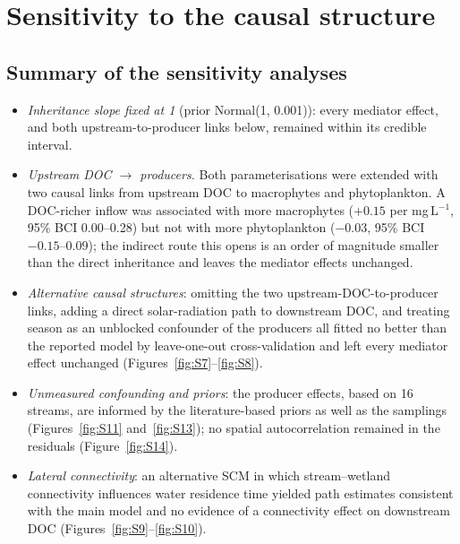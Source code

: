 \documentclass[11pt,a4paper]{article}
\begin{document}
\FloatBarrier
\section{Sensitivity to the causal structure}
\subsection{Summary of the sensitivity analyses}
\begin{itemize}
\item \emph{Inheritance slope fixed at 1} (prior Normal(1, 0.001)): every mediator effect, and both upstream-to-producer links below, remained within its credible interval.
\item \emph{Upstream DOC $\rightarrow$ producers.} Both parameterisations were extended with two causal links from upstream DOC to macrophytes and phytoplankton. A DOC-richer inflow was associated with more macrophytes ($+0.15$ per mg\,L$^{-1}$, 95\% BCI 0.00--0.28) but not with more phytoplankton ($-0.03$, 95\% BCI $-0.15$--0.09); the indirect route this opens is an order of magnitude smaller than the direct inheritance and leaves the mediator effects unchanged.
\item \emph{Alternative causal structures}: omitting the two upstream-DOC-to-producer links, adding a direct solar-radiation path to downstream DOC, and treating season as an unblocked confounder of the producers all fitted no better than the reported model by leave-one-out cross-validation and left every mediator effect unchanged (Figures~\ref{fig:S7}--\ref{fig:S8}).
\item \emph{Unmeasured confounding and priors}: the producer effects, based on 16 streams, are informed by the literature-based priors as well as the samplings (Figures~\ref{fig:S11} and~\ref{fig:S13}); no spatial autocorrelation remained in the residuals (Figure~\ref{fig:S14}).
\item \emph{Lateral connectivity}: an alternative SCM in which stream--wetland connectivity influences water residence time yielded path estimates consistent with the main model and no evidence of a connectivity effect on downstream DOC (Figures~\ref{fig:S9}--\ref{fig:S10}).
\end{itemize}

\FloatBarrier
\end{document}
